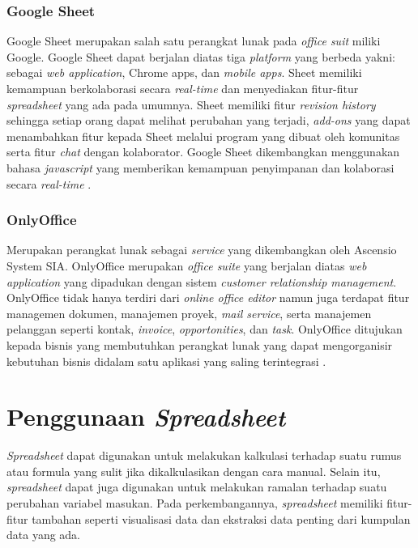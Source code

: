     \subsubsection{Google Sheet}
    Google Sheet merupakan salah satu perangkat lunak pada \textit{office suit} miliki Google. Google Sheet dapat berjalan diatas tiga \textit{platform} yang berbeda yakni: sebagai \textit{web application}, Chrome apps, dan \textit{mobile apps}. Sheet memiliki kemampuan berkolaborasi secara \textit{real-time} dan menyediakan fitur-fitur \textit{spreadsheet} yang ada pada umumnya. Sheet memiliki fitur \textit{revision history} sehingga setiap orang dapat melihat perubahan yang terjadi, \textit{add-ons} yang dapat menambahkan fitur kepada Sheet melalui program yang dibuat oleh komunitas serta fitur \textit{chat} dengan kolaborator. Google Sheet dikembangkan menggunakan bahasa \textit{javascript} yang memberikan kemampuan penyimpanan dan kolaborasi secara \textit{real-time} \citep{GoogleSheet}.

    \subsubsection{OnlyOffice}
    Merupakan perangkat lunak sebagai \textit{service} yang dikembangkan oleh Ascensio System SIA. OnlyOffice merupakan \textit{office suite} yang berjalan diatas \textit{web application} yang dipadukan dengan sistem \textit{customer relationship management}. OnlyOffice tidak hanya terdiri dari \textit{online office editor} namun juga terdapat fitur managemen dokumen, manajemen proyek, \textit{mail service}, serta manajemen pelanggan seperti kontak, \textit{invoice}, \textit{opportonities}, dan \textit{task}. OnlyOffice ditujukan kepada bisnis yang membutuhkan perangkat lunak yang dapat mengorganisir kebutuhan bisnis didalam satu aplikasi yang saling terintegrasi \citep{OnlyOffice}. 


\section{Penggunaan \textit{Spreadsheet}}
\textit{Spreadsheet} dapat digunakan untuk melakukan kalkulasi terhadap suatu rumus atau formula yang sulit jika dikalkulasikan dengan cara manual. Selain itu, \textit{spreadsheet} dapat juga digunakan untuk melakukan ramalan terhadap suatu perubahan variabel masukan. Pada perkembangannya, \textit{spreadsheet} memiliki fitur-fitur tambahan seperti visualisasi data dan ekstraksi data penting dari kumpulan data yang ada.

